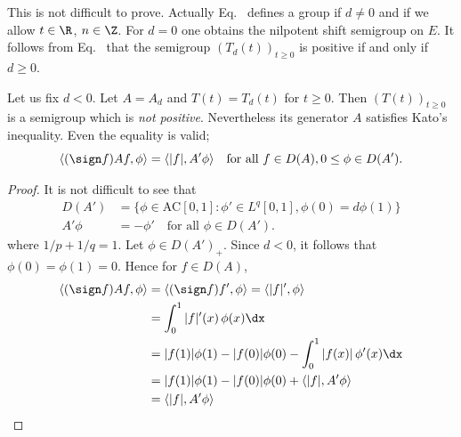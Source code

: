 This is not difficult to prove. 
Actually Eq.~ defines a group if\/ $d \neq 0$ and if we allow $t \in \R$, $n \in \Z $. For $d = 0$ one obtains the nilpotent shift semigroup on $E$.
It follows from Eq.~ that the semigroup $(T_{d}(t))_{t \geq 0}$ is positive if and only if\/ $d \geq 0$.

Let us fix $d < 0$. Let $A = A_{d}$ and $T(t) = T_{d}(t)$ for $t \geq 0$. Then
$(T(t))_{t \geq 0}$ is a semigroup which is \emph{not positive}. Nevertheless its generator $A$ satisfies Kato's inequality. Even the equality is valid;
\ie
\begin{equation}\label{eq:c2-3.10}
\langle(\sign  f) Af,\phi\rangle = \langle|f|,A'\phi \rangle \quad \text{for all } f \in D(A), 0 \leq \phi \in D(A').
\end{equation}

\begin{proof}
It is not difficult to see that
\begin{equation}\label{eq:c2-3.11}
\begin{array}{rl}
D(A') &= \{\phi \in \text{AC}[0,1] \colon \phi' \in L^{q}[0,1], \phi(0) = d\phi(1)\}\\ 
A'\phi &= -\phi' \quad \text{for all } \phi \in D(A').
\end{array}
\end{equation}
where $1/p + 1/q = 1$. Let $\phi \in D(A')_{+}$. 
Since $d < 0$, it follows that $\phi(0) = \phi(1) = 0$. 
Hence for $f \in D(A)$,
\begin{align*}
\langle(\sign  f)Af,\phi\rangle &= \langle(\sign  f)f',\phi\rangle = \langle|f|',\phi\rangle\\
&= \int_{0}^{1} |f|'(x) \, \phi(x) \dx\\
&= |f(1)|\phi(1) - |f(0)|\phi(0) - \int_{0}^{1} |f(x)| \, \phi'(x) \dx\\
&= |f(1)|\phi(1) - |f(0)|\phi(0) + \langle|f|,A'\phi\rangle\\
&= \langle|f|,A'\phi\rangle
\end{align*}
\end{proof}

